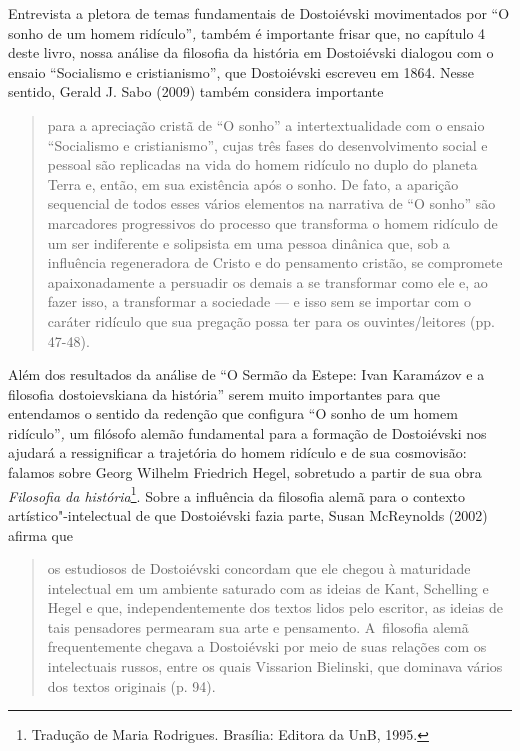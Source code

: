 Entrevista a pletora de temas fundamentais de Dostoiévski movimentados
por ``O sonho de um homem ridículo''\emph{,} também é importante frisar
que, no capítulo 4 deste livro, nossa análise da filosofia da história
em Dostoiévski dialogou com o ensaio ``Socialismo e cristianismo'', que
Dostoiévski escreveu em 1864. Nesse sentido, Gerald J. Sabo (2009)
também considera importante

\begin{quote}
para a apreciação cristã de ``O sonho'' a intertextualidade com o ensaio
``Socialismo e cristianismo'', cujas três fases do desenvolvimento
social e pessoal são replicadas na vida do homem ridículo no duplo do
planeta Terra e, então, em sua existência após o sonho. De fato, a
aparição sequencial de todos esses vários elementos na narrativa de ``O
sonho'' são marcadores progressivos do processo que transforma o homem
ridículo de um ser indiferente e solipsista em uma pessoa dinânica que,
sob a influência regeneradora de Cristo e do pensamento cristão, se
compromete apaixonadamente a persuadir os demais a se transformar como
ele e, ao fazer isso, a transformar a sociedade --- e isso sem se
importar com o caráter ridículo que sua pregação possa ter para os
ouvintes/leitores (pp. 47-48).
\end{quote}

Além dos resultados da análise de ``O Sermão da Estepe: Ivan Karamázov e
a filosofia dostoievskiana da história'' serem muito importantes para
que entendamos o sentido da redenção que configura ``O sonho de um homem
ridículo''\emph{,} um filósofo alemão fundamental para a formação de
Dostoiévski nos ajudará a ressignificar a trajetória do homem ridículo e
de sua cosmovisão: falamos sobre Georg Wilhelm Friedrich Hegel,
sobretudo a partir de sua obra \emph{Filosofia da história}\footnote{Tradução
  de Maria Rodrigues. Brasília: Editora da UnB, 1995.}. Sobre a
influência da filosofia alemã para o contexto artístico"-intelectual de
que Dostoiévski fazia parte, Susan McReynolds (2002) afirma que

\begin{quote}
os estudiosos de Dostoiévski concordam que ele chegou à maturidade
intelectual em um ambiente saturado com as ideias de Kant, Schelling e
Hegel e que, independentemente dos textos lidos pelo escritor, as ideias
de tais pensadores permearam sua arte e pensamento. A~filosofia alemã
frequentemente chegava a Dostoiévski por meio de suas relações com os
intelectuais russos, entre os quais Vissarion Bielinski, que dominava
vários dos textos originais (p. 94).
\end{quote}

